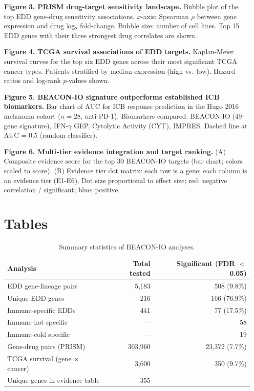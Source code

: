 \documentclass[12pt]{article}
\begin{document}
\textbf{Figure 3. PRISM drug-target sensitivity landscape.}
Bubble plot of the top EDD gene-drug sensitivity associations. $x$-axis: Spearman $\rho$ between gene expression and drug log$_2$ fold-change. Bubble size: number of cell lines. Top 15 EDD genes with their three strongest drug correlates are shown.

\textbf{Figure 4. TCGA survival associations of EDD targets.}
Kaplan-Meier survival curves for the top six EDD genes across their most significant TCGA cancer types. Patients stratified by median expression (high vs.\ low). Hazard ratios and log-rank $p$-values shown.

\textbf{Figure 5. BEACON-IO signature outperforms established ICB biomarkers.}
Bar chart of AUC for ICB response prediction in the Hugo 2016 melanoma cohort ($n = 28$, anti-PD-1). Biomarkers compared: BEACON-IO (49-gene signature), IFN-$\gamma$ GEP, Cytolytic Activity (CYT), IMPRES. Dashed line at AUC = 0.5 (random classifier).

\textbf{Figure 6. Multi-tier evidence integration and target ranking.}
(A) Composite evidence score for the top 30 BEACON-IO targets (bar chart; colors scaled to score). (B) Evidence tier dot matrix: each row is a gene; each column is an evidence tier (E1-E6). Dot size proportional to effect size; red: negative correlation / significant; blue: positive.

\clearpage

\section*{Tables}

\begin{table}[h!]
\centering
\caption{Summary statistics of BEACON-IO analyses.}
\label{tab:summary}
\begin{tabular}{lrr}
\toprule
\textbf{Analysis} & \textbf{Total tested} & \textbf{Significant (FDR $<$ 0.05)} \\
\midrule
EDD gene-lineage pairs & 5,183 & 508 (9.8\%) \\
Unique EDD genes & 216 & 166 (76.9\%) \\
Immune-specific EDDs & 441 & 77 (17.5\%) \\
\quad Immune-hot specific & --- & 58 \\
\quad Immune-cold specific & --- & 19 \\
Gene-drug pairs (PRISM) & 303,960 & 23,372 (7.7\%) \\
TCGA survival (gene $\times$ cancer) & 3,600 & 350 (9.7\%) \\
Unique genes in evidence table & 355 & --- \\
\bottomrule
\end{tabular}
\end{table}
\end{document}
